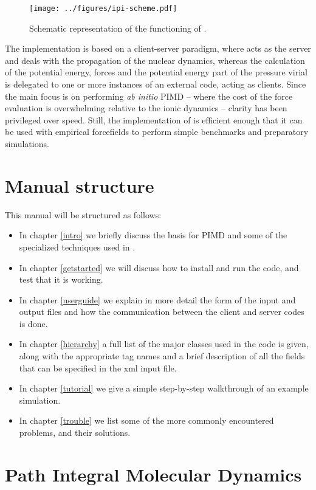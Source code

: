 \documentclass[11pt,english,fleqn]{report}
\begin{document}
\begin{figure}[hb]
\centering\texttt{[image: ../figures/ipi-scheme.pdf]}
\caption{\label{fig:scheme} Schematic representation of the functioning of \ipi{}.}
\end{figure}

The implementation is based on a client-server paradigm, where \ipi
acts as the server and deals with the propagation of the nuclear dynamics,
whereas the calculation of the potential energy, forces and the potential
energy part of the pressure virial is delegated to one or more instances
of an external code, acting as clients. Since the main focus is on
performing \emph{ab initio} PIMD -- where the cost of the force evaluation
is overwhelming relative to the ionic dynamics -- clarity has been
privileged over speed. Still, the implementation of \ipi is efficient
enough that it can be used with empirical forcefields to perform simple
benchmarks and preparatory simulations.


\section{Manual structure}

This manual will be structured as follows:
\begin{itemize}
\item In chapter \ref{intro} we briefly discuss the basis for PIMD and
some of the specialized techniques used in \ipi.
\item In chapter \ref{getstarted} we will discuss how to install
and run the code, and test that it is working.
\item In chapter \ref{userguide} we explain in more detail the form of the input
and output files and how the communication between the client and
server codes is done.
\item In chapter \ref{hierarchy} a full list of the major classes used
in the code is given, along with the appropriate tag names and a brief
description of all the fields that can be specified in the xml input
file.
\item In chapter \ref{tutorial} we give a simple step-by-step walkthrough of
an example \ipi simulation.
\item In chapter \ref{trouble} we list some of the more commonly encountered
problems, and their solutions.
\end{itemize}

\section{Path Integral Molecular Dynamics}
\end{document}
